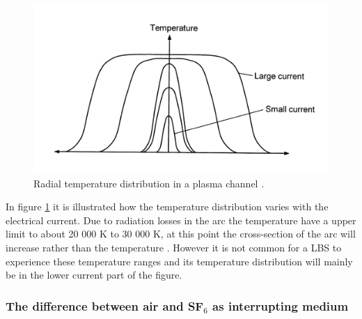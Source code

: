 \documentclass[10pt,a4paper,twoside]{article}
\begin{document}
\begin{figure}[H]
\centering
\includegraphics[scale=0.8]{Bilder/Theory/plasmaChannel1.png}
\caption{Radial temperature distribution in a plasma channel \cite{bib:HVEbreak}.} \label{fig:tempDist2}
\end{figure}

In figure \ref{fig:tempDist2} it is illustrated how the temperature distribution varies with the electrical current. Due to radiation losses in the arc the temperature have a upper limit to about 20 000 K to 30 000 K, at this point the cross-section of the arc will increase rather than the temperature \cite{bib:HVEbreak}. However it is not common for a LBS to experience these temperature ranges and its temperature distribution will mainly be in the lower current part of the figure.

\subsubsection{The difference between air and SF$_6$ as interrupting medium} \label{sec:airandsf}
\end{document}
